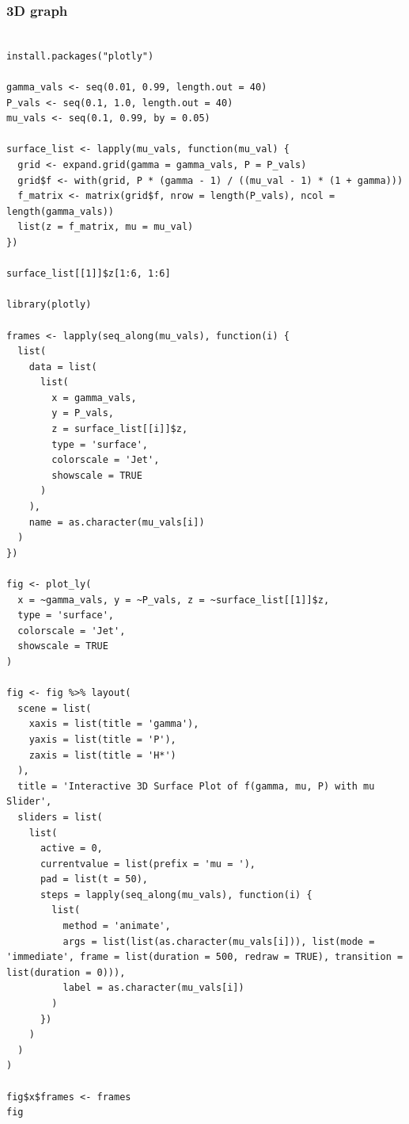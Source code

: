 \documentclass{article}
\begin{document}
\subsubsection{3D graph}
\begin{lstlisting}[style=R]  

install.packages("plotly")

gamma_vals <- seq(0.01, 0.99, length.out = 40)
P_vals <- seq(0.1, 1.0, length.out = 40)
mu_vals <- seq(0.1, 0.99, by = 0.05)

surface_list <- lapply(mu_vals, function(mu_val) {
  grid <- expand.grid(gamma = gamma_vals, P = P_vals)
  grid$f <- with(grid, P * (gamma - 1) / ((mu_val - 1) * (1 + gamma)))
  f_matrix <- matrix(grid$f, nrow = length(P_vals), ncol = length(gamma_vals))
  list(z = f_matrix, mu = mu_val)
})

surface_list[[1]]$z[1:6, 1:6]

library(plotly)

frames <- lapply(seq_along(mu_vals), function(i) {
  list(
    data = list(
      list(
        x = gamma_vals,
        y = P_vals,
        z = surface_list[[i]]$z,
        type = 'surface',
        colorscale = 'Jet',
        showscale = TRUE
      )
    ),
    name = as.character(mu_vals[i])
  )
})

fig <- plot_ly(
  x = ~gamma_vals, y = ~P_vals, z = ~surface_list[[1]]$z,
  type = 'surface',
  colorscale = 'Jet',
  showscale = TRUE
)

fig <- fig %>% layout(
  scene = list(
    xaxis = list(title = 'gamma'),
    yaxis = list(title = 'P'),
    zaxis = list(title = 'H*')
  ),
  title = 'Interactive 3D Surface Plot of f(gamma, mu, P) with mu Slider',
  sliders = list(
    list(
      active = 0,
      currentvalue = list(prefix = 'mu = '),
      pad = list(t = 50),
      steps = lapply(seq_along(mu_vals), function(i) {
        list(
          method = 'animate',
          args = list(list(as.character(mu_vals[i])), list(mode = 'immediate', frame = list(duration = 500, redraw = TRUE), transition = list(duration = 0))),
          label = as.character(mu_vals[i])
        )
      })
    )
  )
)

fig$x$frames <- frames
fig

\end{lstlisting}  
\end{document}

